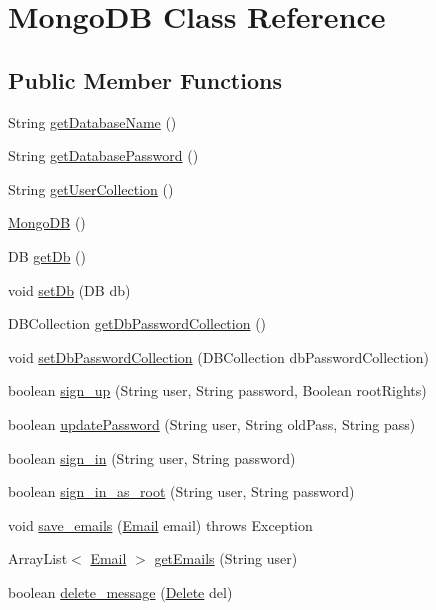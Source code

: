 \hypertarget{class_mongo_d_b}{}\section{Mongo\+DB Class Reference}
\label{class_mongo_d_b}
\subsection*{Public Member Functions}
\begin{DoxyCompactItemize}
\item 
String \hyperlink{class_mongo_d_b_a5e60a5605d070637ce60a3dc4e67138a}{get\+Database\+Name} ()
\item 
String \hyperlink{class_mongo_d_b_a86a8fe83d594dc26f709b9e048c79fe6}{get\+Database\+Password} ()
\item 
String \hyperlink{class_mongo_d_b_adf1dfa43d61be69c1673bb8ddfeb210e}{get\+User\+Collection} ()
\item 
\hyperlink{class_mongo_d_b_a7170cf8463b15fad9f4b8d9373b16201}{Mongo\+DB} ()
\item 
DB \hyperlink{class_mongo_d_b_a70007164c403cb52ac8e87b0137aa27e}{get\+Db} ()
\item 
void \hyperlink{class_mongo_d_b_afa9b1ff69f975af22fdff7860c600c8e}{set\+Db} (DB db)
\item 
D\+B\+Collection \hyperlink{class_mongo_d_b_aa46409219a8b26d1b0a229e464be7258}{get\+Db\+Password\+Collection} ()
\item 
void \hyperlink{class_mongo_d_b_a54e2ada48adc6b47a40d5092113b2369}{set\+Db\+Password\+Collection} (D\+B\+Collection db\+Password\+Collection)
\item 
boolean \hyperlink{class_mongo_d_b_a9c69be7c091bffc9d1950e118fdb2251}{sign\+\_\+up} (String user, String password, Boolean root\+Rights)
\item 
boolean \hyperlink{class_mongo_d_b_a43b2b812eb5b88c87d2c3e2b100ae74b}{update\+Password} (String user, String old\+Pass, String pass)
\item 
boolean \hyperlink{class_mongo_d_b_a672df0039a1fcd302bd399089bb7fe28}{sign\+\_\+in} (String user, String password)
\item 
boolean \hyperlink{class_mongo_d_b_afa13d12f56548fcf6c5ca12ec66bc73c}{sign\+\_\+in\+\_\+as\+\_\+root} (String user, String password)
\item 
void \hyperlink{class_mongo_d_b_a2e376b333a71c82b5dd8e054d538e7f4}{save\+\_\+emails} (\hyperlink{class_email}{Email} email)  throws Exception 
\item 
Array\+List$<$ \hyperlink{class_email}{Email} $>$ \hyperlink{class_mongo_d_b_afb31e6d36e9b20ceff3f13901bfc4012}{get\+Emails} (String user)
\item 
boolean \hyperlink{class_mongo_d_b_a1bc531a4e919dd942edeafc749e30f81}{delete\+\_\+message} (\hyperlink{class_delete}{Delete} del)
\end{DoxyCompactItemize}


